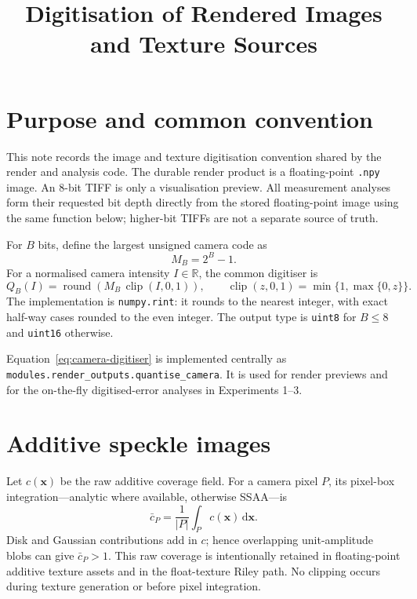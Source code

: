 \documentclass[11pt,a4paper]{article}
\title{Digitisation of Rendered Images and Texture Sources}
\author{}
\date{}
\newcommand{\clip}{\operatorname{clip}}
\newcommand{\round}{\operatorname{round}}
\begin{document}
\maketitle

\section{Purpose and common convention}

This note records the image and texture digitisation convention shared by the
render and analysis code.  The durable render product is a floating-point
\texttt{.npy} image.  An 8-bit TIFF is only a visualisation preview.  All
measurement analyses form their requested bit depth directly from the stored
floating-point image using the same function below; higher-bit TIFFs are not a
separate source of truth.

For $B$ bits, define the largest unsigned camera code as
\begin{equation}
  M_B = 2^B-1.
\end{equation}
For a normalised camera intensity $I\in\mathbb{R}$, the common digitiser is
\begin{equation}
  \boxed{
  Q_B(I) = \round\!\left(M_B\,\clip(I,0,1)\right),
  \qquad
  \clip(z,0,1)=\min\{1,\max\{0,z\}\}.}
  \label{eq:camera-digitiser}
\end{equation}
The implementation is \texttt{numpy.rint}: it rounds to the nearest integer,
with exact half-way cases rounded to the even integer.  The output type is
\texttt{uint8} for $B\leq 8$ and \texttt{uint16} otherwise.

Equation~\eqref{eq:camera-digitiser} is implemented centrally as
\texttt{modules.render\_outputs.quantise\_camera}.  It is used for render
previews and for the on-the-fly digitised-error analyses in Experiments 1--3.

\section{Additive speckle images}

Let $c(\bm{x})$ be the raw additive coverage field.  For a camera pixel
$P$, its pixel-box integration---analytic where available, otherwise SSAA---is
\begin{equation}
  \bar c_P = \frac{1}{|P|}\int_P c(\bm{x})\,\mathrm{d}\bm{x}.
  \label{eq:coverage-integral}
\end{equation}
Disk and Gaussian contributions add in $c$; hence overlapping unit-amplitude
blobs can give $\bar c_P>1$.  This raw coverage is intentionally retained in
floating-point additive texture assets and in the float-texture Riley path.
No clipping occurs during texture generation or before pixel integration.
\end{document}
